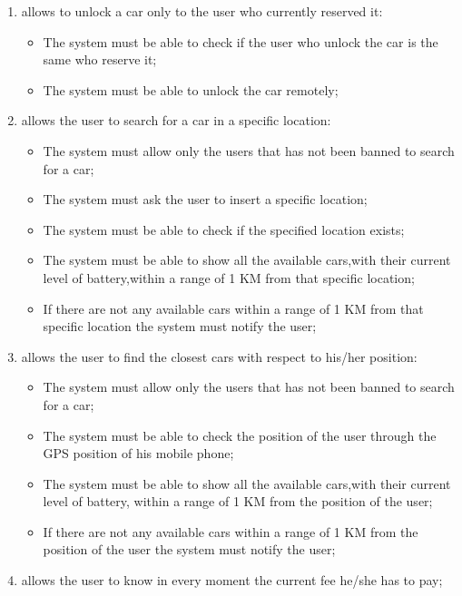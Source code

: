 \begin{enumerate}
\item  allows to unlock a car only to the user who currently reserved it:

\begin{itemize}
\item The system must be able to check if the user who unlock the car is the same who reserve it;
\item The system must be able to unlock the car remotely;
\end{itemize}

\item allows the user to search for a car in a specific location:

\begin{itemize}
\item The system must allow only the users that has not been banned to search for a car;
\item The system must ask the user to insert a specific location;
\item The system must be able to check if the specified location exists;
\item The system must be able to show all the available cars,with their current level of battery,within a range of 1 KM from that specific location;
\item If there are not any available cars within a range of 1 KM from that specific location the system must notify the user;
\end{itemize}

\item allows the user to find the closest cars with respect to his/her position:

\begin{itemize}
\item The system must allow only the users that has not been banned to search for a car;
\item The system must be able to check the position of the user through the GPS position of his mobile phone;
\item The system must be able to show all the available cars,with their current level of battery, within a range of 1 KM from the position of the user;
\item If there are not any available cars within a range of 1 KM from the position of the user the system must notify the user;
\end{itemize}

\item allows the user to know in every moment the current fee he/she has to pay;


\end{enumerate}
